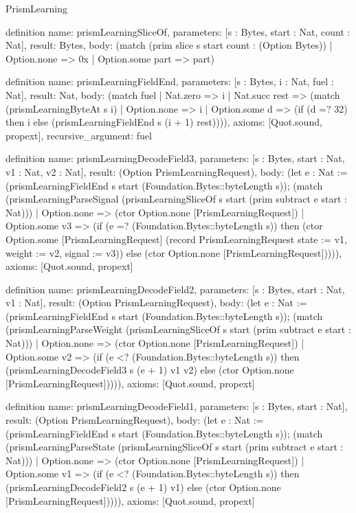 \begin{lexlean}{PrismLearning}
\begin{semanticmodule}
definition{
  name: prismLearningSliceOf,
  parameters: [s : Bytes, start : Nat, count : Nat],
  result: Bytes,
  body: (match (prim slice s start count : (Option Bytes))
    | Option.none => 0x
    | Option.some part => part)
}

definition{
  name: prismLearningFieldEnd,
  parameters: [s : Bytes, i : Nat, fuel : Nat],
  result: Nat,
  body: (match fuel
    | Nat.zero => i
    | Nat.succ rest => (match (prismLearningByteAt s i)
      | Option.none => i
      | Option.some d => (if (d =? 32) then i else (prismLearningFieldEnd s (i + 1) rest)))),
  axioms: [Quot.sound, propext],
  recursive_argument: fuel
}

definition{
  name: prismLearningDecodeField3,
  parameters: [s : Bytes, start : Nat, v1 : Nat, v2 : Nat],
  result: (Option PrismLearningRequest),
  body: (let e : Nat := (prismLearningFieldEnd s start (Foundation.Bytes::byteLength s)); (match (prismLearningParseSignal (prismLearningSliceOf s start (prim subtract e start : Nat)))
    | Option.none => (ctor Option.none [PrismLearningRequest])
    | Option.some v3 => (if (e =? (Foundation.Bytes::byteLength s)) then (ctor Option.some [PrismLearningRequest] (record PrismLearningRequest {state := v1, weight := v2, signal := v3})) else (ctor Option.none [PrismLearningRequest])))),
  axioms: [Quot.sound, propext]
}

definition{
  name: prismLearningDecodeField2,
  parameters: [s : Bytes, start : Nat, v1 : Nat],
  result: (Option PrismLearningRequest),
  body: (let e : Nat := (prismLearningFieldEnd s start (Foundation.Bytes::byteLength s)); (match (prismLearningParseWeight (prismLearningSliceOf s start (prim subtract e start : Nat)))
    | Option.none => (ctor Option.none [PrismLearningRequest])
    | Option.some v2 => (if (e <? (Foundation.Bytes::byteLength s)) then (prismLearningDecodeField3 s (e + 1) v1 v2) else (ctor Option.none [PrismLearningRequest])))),
  axioms: [Quot.sound, propext]
}

definition{
  name: prismLearningDecodeField1,
  parameters: [s : Bytes, start : Nat],
  result: (Option PrismLearningRequest),
  body: (let e : Nat := (prismLearningFieldEnd s start (Foundation.Bytes::byteLength s)); (match (prismLearningParseState (prismLearningSliceOf s start (prim subtract e start : Nat)))
    | Option.none => (ctor Option.none [PrismLearningRequest])
    | Option.some v1 => (if (e <? (Foundation.Bytes::byteLength s)) then (prismLearningDecodeField2 s (e + 1) v1) else (ctor Option.none [PrismLearningRequest])))),
  axioms: [Quot.sound, propext]
}


\end{semanticmodule}
\end{lexlean}
